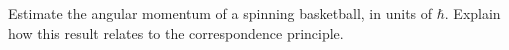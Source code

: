 Estimate the angular momentum of a
spinning basketball, in units of $\hbar$.
Explain how this result relates to the correspondence principle.

